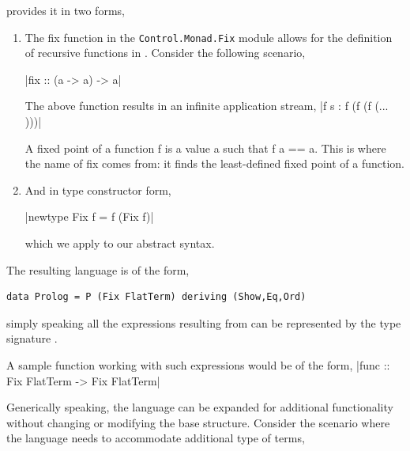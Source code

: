\documentclass[thesis-solanki.tex]{subfiles}
\begin{document}
 provides it in two forms,
\begin{enumerate}

\item The fix function in the \texttt{Control.Monad.Fix} module allows for the definition of recursive functions in . Consider the following scenario,

|fix :: (a -> a) -> a|

The above function results in an infinite application stream,
|f s : f (f (f (... )))|

A fixed point of a function f is a value a such that f a == a. This is where the name of fix comes from: it finds the least-defined fixed
point of a function.

\item And in type constructor form,

|newtype Fix f = f (Fix f)|

which we apply to our abstract syntax.

\end{enumerate}


The resulting language is of the form,
\begin{verbatim}
data Prolog = P (Fix FlatTerm) deriving (Show,Eq,Ord)
\end{verbatim}
%
simply speaking all the expressions resulting from  can be represented  by the type signature .

A sample function working with such expressions would be of the form,
|func :: Fix FlatTerm -> Fix FlatTerm|


Generically speaking, the language can be expanded for additional functionality without changing or modifying the base structure. Consider
the scenario where the language needs to accommodate additional type of terms,
\end{document}

